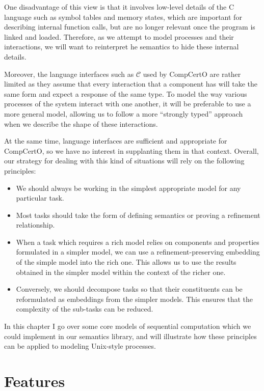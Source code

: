 \documentclass{report}
\begin{document}
One disadvantage of this view
is that it involves low-level details of the C language
such as symbol tables and memory states,
which are important for describing internal function calls,
but are no longer relevant once the program is linked and loaded.
Therefore,
as we attempt to model processes and their interactions,
we will want to reinterpret he semantics to hide these internal details.

Moreover,
the language interfaces such as $\mathcal{C}$ used by CompCertO
are rather limited as they assume that every interaction
that a component has will take the same form
and expect a response of the same type.
To model the way various processes of the system interact with one another,
it will be preferable to use a more general model,
allowing us to follow a more ``strongly typed'' approach
when we describe the shape of these interactions.

At the same time,
language interfaces are sufficient and appropriate for CompCertO,
so we have no interest in supplanting them in that context.
Overall,
our strategy for dealing with this kind of situations
will rely on the following principles:
\begin{itemize}
  \item We should always be working in the simplest appropriate model
    for any particular task.
  \item Most tasks should take the form of defining semantics
    or proving a refinement relationship.
  \item When a task which requires a rich model
    relies on components and properties formulated in a simpler model,
    we can use a refinement-preserving embedding of the simple model into the rich one.
    This allows us to use the results obtained in the simpler model
    within the context of the richer one.
  \item Conversely,
    we should decompose tasks so that
    their constituents can be reformulated as embeddings from
    the simpler models.
    This ensures that the complexity of the sub-tasks can be reduced.
\end{itemize}
In this chapter I go over some core models
of sequential computation
which we could implement in our semantics library,
and will illustrate how these principles
can be applied to modeling Unix-style processes.


\section{Features} %
\end{document}
